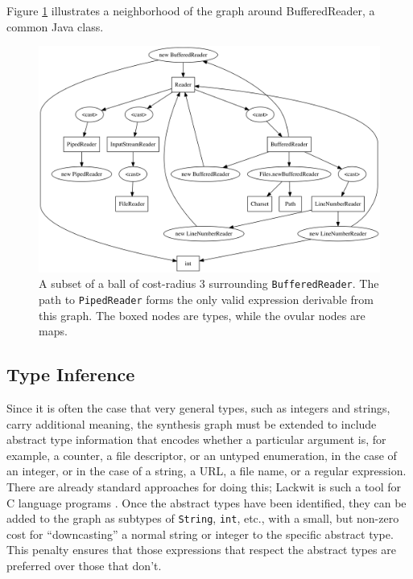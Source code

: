 Figure \ref{examplegraph} illustrates a neighborhood of the graph around BufferedReader, a common Java class.

\begin{figure}[!htb]
\centering
\includegraphics[width=\linewidth]{exampleGraph}
\caption{A subset of a ball of cost-radius $3$ surrounding \texttt{BufferedReader}. The path to \texttt{PipedReader} forms the only valid expression derivable from this graph. The boxed nodes are types, while the ovular nodes are maps.\label{examplegraph}}
\end{figure}

\subsection{Type Inference}

Since it is often the case that very general types, such as integers and strings, carry additional meaning, the synthesis graph must be extended to include abstract type information that encodes whether a particular argument is, for example, a counter, a file descriptor, or an untyped enumeration, in the case of an integer, or in the case of a string, a URL, a file name, or a regular expression. There are already standard approaches for doing this; Lackwit is such a tool for C language programs \cite{DBLP:conf/icse/OCallahanJ97}. Once the abstract types have been identified, they can be added to the graph as subtypes of \texttt{String}, \texttt{int}, etc., with a small, but non-zero cost for ``downcasting'' a normal string or integer to the specific abstract type. This penalty ensures that those expressions that respect the abstract types are preferred over those that don't.

